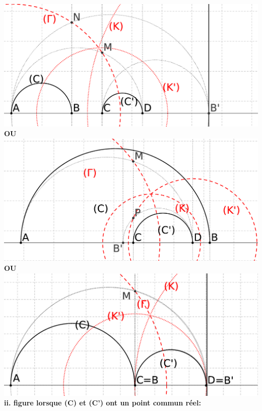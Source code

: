 \documentclass[a4paper, 12pt, twoside]{book}
\begin{document}
 
 \includegraphics[scale=0.3]{figures/bis2.eps} \\
 
\textbf{OU}\\

\includegraphics[scale=0.3]{figures/bis3.eps} \\

\textbf{OU}\\


\includegraphics[scale=0.4]{figures/bis4.eps} \\

\textbf{ii.  figure lorsque (C) et (C') ont un point commun réel:}\\
\end{document}
